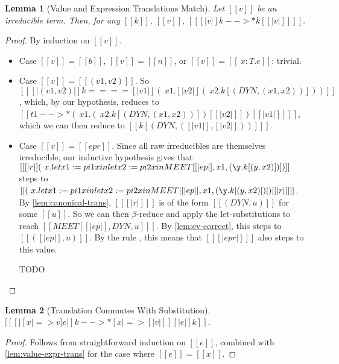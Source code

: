 \documentclass[11pt]{article}
\newtheorem{lemma}{Lemma}[section]
\newcommand{\rrule}[1]{\rref*{#1}}
\begin{document}
\begin{lemma}[Value and Expression Translations Match]
	\label{lem:value-expr-trans}
	Let $[[v]]$ be an irreducible term. Then, for any $[[k]]$, $[[v]]$, $[[ [|v|]k -->* k [ [|v|] ]  ]]$.
\end{lemma}
\begin{proof}
	By induction on $[[v]]$. 

	\begin{itemize}
		\item Case $[[v]] = [[b]]$, $[[v]] = [[n]]$, or $[[v]] = [[\ x : T . e]]$: trivial.
		\item Case $[[v]] = [[(v1, v2)]]$.
		      So $[[ [|(v1, v2)|]k ==== [| v1 |](\ x1 . [|v2|](\ x2 . k[(DYN, (x1, x2))] ) )  ]]$,
		      which, by our hypothesis, reduces to  $[[t1 -->* (\ x1 . (\ x2 . k[(DYN, (x1, x2))] )[ [|v2|] ] )[ [|v1|] ] ]]$,
		      which we can then reduce to $[[k[(DYN, ([|v1|],[|v2|]))] ]]$.
		\item Case $[[v]] = [[ep r]]$. Since all raw irreducibles are themselves irreducible,
		      our inductive hypothesis gives that
		      $[[ [|r|] (\ x . let x1 := pi1 x in let x2 := pi2 x in MEET [ [|ep|],x1, (\y . k [(y,x2)]) ] )]]$
		      steps to $[[(\ x . let x1 := pi1 x in let x2 := pi2 x in MEET [ [|ep|],x1, (\y . k [(y,x2)]) ] )[ [|r|] ] ]]$.
		      By \autoref{lem:canonical-trans}, $[[ [|r|] ]]$ is of the form
		      $[[(DYN, u)]]$ for some $[[u]]$.
		      So we can then $\beta$-reduce and apply the let-substitutions to reach $[[ MEET[ [|ep|], DYN, u ]  ]]$.
		      By \autoref{lem:ev-correct}, this steps to $[[([|ep|], u)]]$.
		      By the rule \rrule{TransformEv}, this means that $[[ [|ep r|] ]]$ also steps to this value.


		      TODO 
	\end{itemize}
\end{proof}

\begin{lemma}[Translation Commutes With Substitution]
	\label{lem:subst-commut}
	$[[ [|[x |=> v]e|]k -->* [x |=> [|v|] ][|e|]k   ]]$.
\end{lemma}
\begin{proof}
	Follows from straightforward induction on $[[e]]$, combined with \autoref{lem:value-expr-trans}
	for the case where $[[e]]=[[x]]$.
\end{proof}
\end{document}
